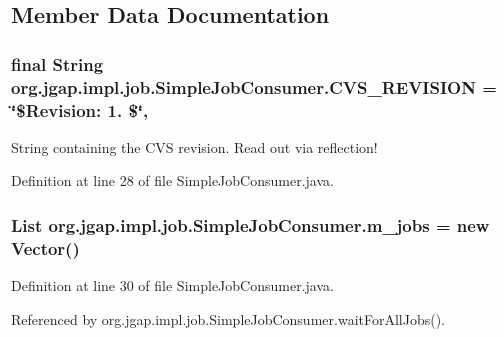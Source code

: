 \subsection{Member Data Documentation}
\hypertarget{classorg_1_1jgap_1_1impl_1_1job_1_1_simple_job_consumer_a648c25b78d381e24952c7a1ce3e0e457}{
\subsubsection[{C\-V\-S\-\_\-\-R\-E\-V\-I\-S\-I\-O\-N}]{\setlength{\rightskip}{0pt plus 5cm}final String org.\-jgap.\-impl.\-job.\-Simple\-Job\-Consumer.\-C\-V\-S\-\_\-\-R\-E\-V\-I\-S\-I\-O\-N = \char`\"{}\$Revision\-: 1. \$\char`\"{}\hspace{0.3cm}{\ttfamily [static]}, {\ttfamily [private]}}}\label{classorg_1_1jgap_1_1impl_1_1job_1_1_simple_job_consumer_a648c25b78d381e24952c7a1ce3e0e457}
String containing the C\-V\-S revision. Read out via reflection! 

Definition at line 28 of file Simple\-Job\-Consumer.\-java.

\hypertarget{classorg_1_1jgap_1_1impl_1_1job_1_1_simple_job_consumer_a37b72f0039fcfef98878a4118e1ba4ec}{
\subsubsection[{m\-\_\-jobs}]{\setlength{\rightskip}{0pt plus 5cm}List org.\-jgap.\-impl.\-job.\-Simple\-Job\-Consumer.\-m\-\_\-jobs = new Vector()\hspace{0.3cm}{\ttfamily [private]}}}\label{classorg_1_1jgap_1_1impl_1_1job_1_1_simple_job_consumer_a37b72f0039fcfef98878a4118e1ba4ec}


Definition at line 30 of file Simple\-Job\-Consumer.\-java.



Referenced by org.\-jgap.\-impl.\-job.\-Simple\-Job\-Consumer.\-wait\-For\-All\-Jobs().

